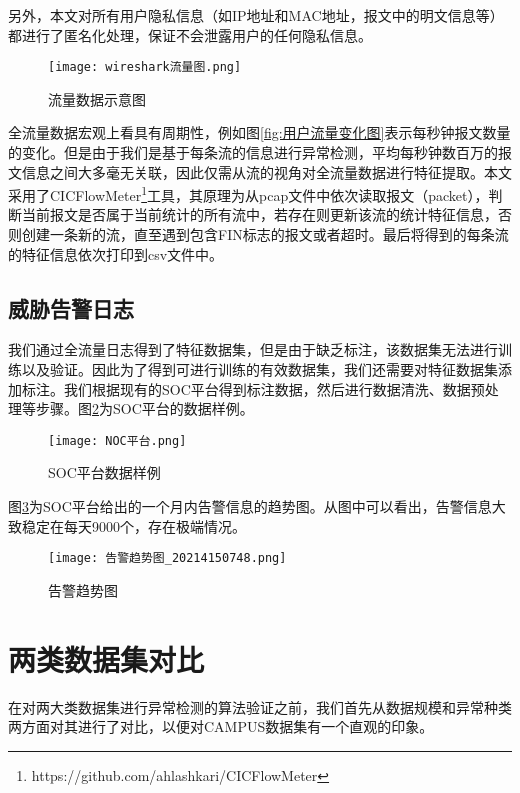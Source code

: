 另外，本文对所有用户隐私信息（如IP地址和MAC地址，报文中的明文信息等）都进行了匿名化处理，保证不会泄露用户的任何隐私信息。

\begin{figure}
    \centering
    \texttt{[image: wireshark流量图.png]}
    \caption{流量数据示意图}
    \label{fig:wireshark}
  \end{figure}

全流量数据宏观上看具有周期性，例如图\ref{fig:用户流量变化图}表示每秒钟报文数量的变化。但是由于我们是基于每条流的信息进行异常检测，平均每秒钟数百万的报文信息之间大多毫无关联，因此仅需从流的视角对全流量数据进行特征提取。本文采用了CICFlowMeter\footnote{https://github.com/ahlashkari/CICFlowMeter}工具，其原理为从pcap文件中依次读取报文（packet），判断当前报文是否属于当前统计的所有流中，若存在则更新该流的统计特征信息，否则创建一条新的流，直至遇到包含FIN标志的报文或者超时。最后将得到的每条流的特征信息依次打印到csv文件中。


\subsection{威胁告警日志}
我们通过全流量日志得到了特征数据集，但是由于缺乏标注，该数据集无法进行训练以及验证。因此为了得到可进行训练的有效数据集，我们还需要对特征数据集添加标注。我们根据现有的SOC平台得到标注数据，然后进行数据清洗、数据预处理等步骤。图\ref{fig:NOC平台数据样例}为SOC平台的数据样例。
\begin{figure}
    \centering
    \texttt{[image: NOC平台.png]}
    \caption{SOC平台数据样例}
    \label{fig:NOC平台数据样例}
  \end{figure}


图\ref{fig:告警趋势图}为SOC平台给出的一个月内告警信息的趋势图。从图中可以看出，告警信息大致稳定在每天9000个，存在极端情况。
\begin{figure}
    \centering
    \texttt{[image: 告警趋势图\_20214150748.png]}
    \caption{告警趋势图}
    \label{fig:告警趋势图}
  \end{figure}
\section{两类数据集对比}
在对两大类数据集进行异常检测的算法验证之前，我们首先从数据规模和异常种类两方面对其进行了对比，以便对CAMPUS数据集有一个直观的印象。

